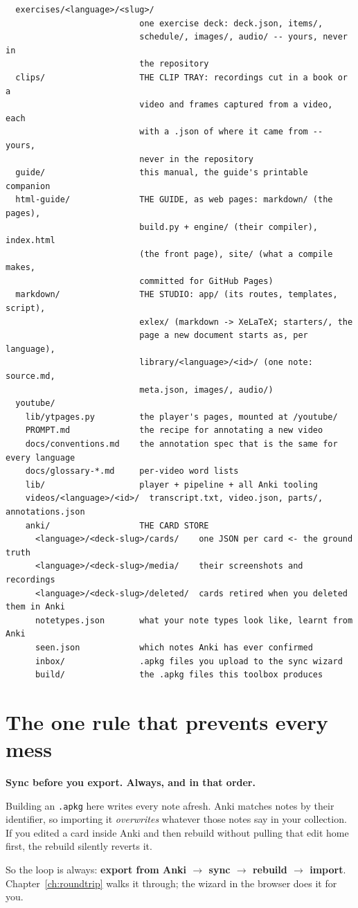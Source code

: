 \documentclass[11pt,oneside]{report}
\newcommand{\file}[1]{\texttt{#1}}
\begin{document}
\begin{lstlisting}
  exercises/<language>/<slug>/
                           one exercise deck: deck.json, items/,
                           schedule/, images/, audio/ -- yours, never in
                           the repository
  clips/                   THE CLIP TRAY: recordings cut in a book or a
                           video and frames captured from a video, each
                           with a .json of where it came from -- yours,
                           never in the repository
  guide/                   this manual, the guide's printable companion
  html-guide/              THE GUIDE, as web pages: markdown/ (the pages),
                           build.py + engine/ (their compiler), index.html
                           (the front page), site/ (what a compile makes,
                           committed for GitHub Pages)
  markdown/                THE STUDIO: app/ (its routes, templates, script),
                           exlex/ (markdown -> XeLaTeX; starters/, the
                           page a new document starts as, per language),
                           library/<language>/<id>/ (one note: source.md,
                           meta.json, images/, audio/)
  youtube/
    lib/ytpages.py         the player's pages, mounted at /youtube/
    PROMPT.md              the recipe for annotating a new video
    docs/conventions.md    the annotation spec that is the same for every language
    docs/glossary-*.md     per-video word lists
    lib/                   player + pipeline + all Anki tooling
    videos/<language>/<id>/  transcript.txt, video.json, parts/, annotations.json
    anki/                  THE CARD STORE
      <language>/<deck-slug>/cards/    one JSON per card <- the ground truth
      <language>/<deck-slug>/media/    their screenshots and recordings
      <language>/<deck-slug>/deleted/  cards retired when you deleted them in Anki
      notetypes.json       what your note types look like, learnt from Anki
      seen.json            which notes Anki has ever confirmed
      inbox/               .apkg files you upload to the sync wizard
      build/               the .apkg files this toolbox produces
\end{lstlisting}

\section{The one rule that prevents every mess}
\label{sec:golden}

\begin{warnbox}
\textbf{Sync before you export. Always, and in that order.}

\medskip
Building an \file{.apkg} here writes every note afresh. Anki matches notes by
their identifier, so importing it \emph{overwrites} whatever those notes say
in your collection. If you edited a card inside Anki and then rebuild without
pulling that edit home first, the rebuild silently reverts it.

\medskip
So the loop is always: \textbf{export from Anki $\rightarrow$ sync $\rightarrow$
rebuild $\rightarrow$ import}. Chapter~\ref{ch:roundtrip} walks it through;
the wizard in the browser does it for you.
\end{warnbox}
\end{document}
